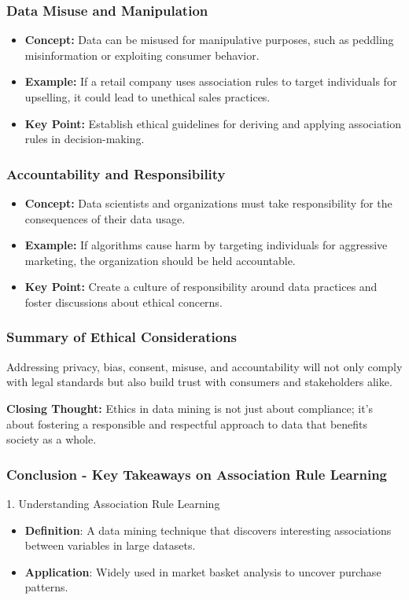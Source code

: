 \documentclass[aspectratio=169]{beamer}
\begin{document}
\begin{frame}[fragile]
    \frametitle{Data Misuse and Manipulation}
    \begin{itemize}
        \item \textbf{Concept:} Data can be misused for manipulative purposes, such as peddling misinformation or exploiting consumer behavior.
        \item \textbf{Example:} If a retail company uses association rules to target individuals for upselling, it could lead to unethical sales practices.
        \item \textbf{Key Point:} Establish ethical guidelines for deriving and applying association rules in decision-making.
    \end{itemize}
\end{frame}

\begin{frame}[fragile]
    \frametitle{Accountability and Responsibility}
    \begin{itemize}
        \item \textbf{Concept:} Data scientists and organizations must take responsibility for the consequences of their data usage.
        \item \textbf{Example:} If algorithms cause harm by targeting individuals for aggressive marketing, the organization should be held accountable.
        \item \textbf{Key Point:} Create a culture of responsibility around data practices and foster discussions about ethical concerns.
    \end{itemize}
\end{frame}

\begin{frame}[fragile]
    \frametitle{Summary of Ethical Considerations}
    Addressing privacy, bias, consent, misuse, and accountability will not only comply with legal standards but also build trust with consumers and stakeholders alike. 

    \textbf{Closing Thought:} Ethics in data mining is not just about compliance; it's about fostering a responsible and respectful approach to data that benefits society as a whole.
\end{frame}

\begin{frame}[fragile]
    \frametitle{Conclusion - Key Takeaways on Association Rule Learning}
    
    \begin{block}{1. Understanding Association Rule Learning}
        \begin{itemize}
            \item \textbf{Definition}: A data mining technique that discovers interesting associations between variables in large datasets.
            \item \textbf{Application}: Widely used in market basket analysis to uncover purchase patterns.
        \end{itemize}
    \end{block}
\end{frame}
\end{document}
